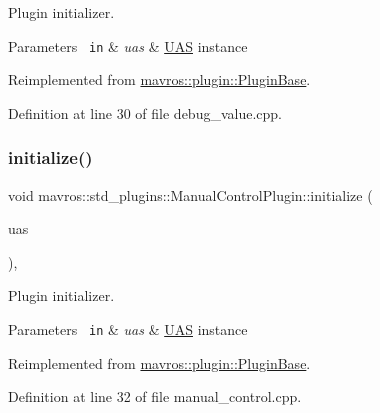 Plugin initializer. 


\begin{DoxyParams}[1]{Parameters}
\mbox{\texttt{ in}}  & {\em uas} & {\ttfamily \mbox{\hyperlink{classmavros_1_1UAS}{U\+AS}}} instance \\
\hline
\end{DoxyParams}


Reimplemented from \mbox{\hyperlink{group__plugin_gad5313a41da4d26acbbabf008cdc21e82}{mavros\+::plugin\+::\+Plugin\+Base}}.



Definition at line 30 of file debug\+\_\+value.\+cpp.

\mbox{\label{group__plugin_ga20c1a742c3270e32e681f08f79199451}} 
\subsubsection{\texorpdfstring{initialize()}{initialize()}\hspace{0.1cm}{\footnotesize\ttfamily [2/41]}}
{\footnotesize\ttfamily void mavros\+::std\+\_\+plugins\+::\+Manual\+Control\+Plugin\+::initialize (\begin{DoxyParamCaption}\item[{\mbox{\hyperlink{classmavros_1_1UAS}{U\+AS}} \&}]{uas }\end{DoxyParamCaption})\hspace{0.3cm}{\ttfamily [inline]}, {\ttfamily [virtual]}}



Plugin initializer. 


\begin{DoxyParams}[1]{Parameters}
\mbox{\texttt{ in}}  & {\em uas} & {\ttfamily \mbox{\hyperlink{classmavros_1_1UAS}{U\+AS}}} instance \\
\hline
\end{DoxyParams}


Reimplemented from \mbox{\hyperlink{group__plugin_gad5313a41da4d26acbbabf008cdc21e82}{mavros\+::plugin\+::\+Plugin\+Base}}.



Definition at line 32 of file manual\+\_\+control.\+cpp.

\mbox{\label{group__plugin_gad13e24eaf9016887b2544eb816ab3327}} 
